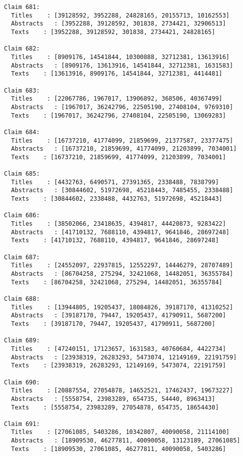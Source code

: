 \documentclass[11pt]{article}
\begin{document}
\begin{Verbatim}[commandchars=\\\{\}]
Claim 681:
  Titles    : [39128592, 3952288, 24828165, 20155713, 10162553]
  Abstracts   : [3952288, 39128592, 301838, 2734421, 32906513]
  Texts    : [3952288, 39128592, 301838, 2734421, 24828165]

Claim 682:
  Titles    : [8909176, 14541844, 10300888, 32712381, 13613916]
  Abstracts   : [8909176, 13613916, 14541844, 32712381, 1631583]
  Texts    : [13613916, 8909176, 14541844, 32712381, 4414481]

Claim 683:
  Titles    : [22067786, 1967017, 13906892, 368506, 40367499]
  Abstracts   : [1967017, 36242796, 22505190, 27408104, 9769310]
  Texts    : [1967017, 36242796, 27408104, 22505190, 13069283]

Claim 684:
  Titles    : [16737210, 41774099, 21859699, 21377587, 23377475]
  Abstracts   : [16737210, 21859699, 41774099, 21203899, 7034001]
  Texts    : [16737210, 21859699, 41774099, 21203899, 7034001]

Claim 685:
  Titles    : [4432763, 6490571, 27391365, 2338488, 7838799]
  Abstracts   : [30844602, 51972698, 45218443, 7485455, 2338488]
  Texts    : [30844602, 2338488, 4432763, 51972698, 45218443]

Claim 686:
  Titles    : [38502066, 23418635, 4394817, 44420873, 9283422]
  Abstracts   : [41710132, 7688110, 4394817, 9641846, 28697248]
  Texts    : [41710132, 7688110, 4394817, 9641846, 28697248]

Claim 687:
  Titles    : [24552097, 22937815, 12552297, 14446279, 28707489]
  Abstracts   : [86704258, 275294, 32421068, 14482051, 36355784]
  Texts    : [86704258, 32421068, 275294, 14482051, 36355784]

Claim 688:
  Titles    : [13944805, 19205437, 18084826, 39187170, 41310252]
  Abstracts   : [39187170, 79447, 19205437, 41790911, 5687200]
  Texts    : [39187170, 79447, 19205437, 41790911, 5687200]

Claim 689:
  Titles    : [47240151, 17123657, 1631583, 40760684, 4422734]
  Abstracts   : [23938319, 26283293, 5473074, 12149169, 22191759]
  Texts    : [23938319, 26283293, 12149169, 5473074, 22191759]

Claim 690:
  Titles    : [20887554, 27054878, 14652521, 17462437, 19673227]
  Abstracts   : [5558754, 23983289, 654735, 54440, 8963413]
  Texts    : [5558754, 23983289, 27054878, 654735, 18654430]

Claim 691:
  Titles    : [27061085, 5403286, 10342807, 40090058, 21114100]
  Abstracts   : [18909530, 46277811, 40090058, 13123189, 27061085]
  Texts    : [18909530, 27061085, 46277811, 40090058, 5403286]


\end{Verbatim}
\end{document}
